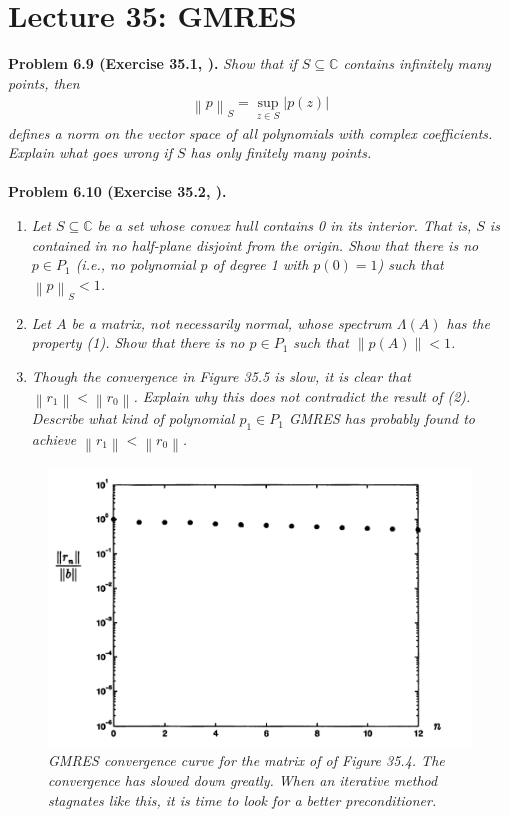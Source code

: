 \documentclass[a4paper,oneside]{book}
\numberwithin{equation}{chapter}
\begin{document}
\section{Lecture 35: GMRES}
\textbf{Problem 6.9 (Exercise 35.1, \cite{1}).} \textit{Show that if $S \subseteq \mathbb{C}$ contains infinitely many points, then}
\begin{align}
{\left\| p \right\|_S} = \mathop {\sup }\limits_{z \in S} \left| {p\left( z \right)} \right|
\end{align}
\textit{defines a norm on the vector space of all polynomials with complex coefficients. Explain what goes wrong if $S$ has only finitely many points.}\\
\\
\textbf{Problem 6.10 (Exercise 35.2, \cite{1}).} 
\begin{enumerate}
\item \textit{Let $S \subseteq \mathbb{C}$ be a set whose convex hull contains 0 in its interior. That is, $S$ is contained in no half-plane disjoint from the origin. Show that there is no $p\in P_1$ (i.e., no polynomial $p$ of degree 1 with $p\left(0\right)=1$) such that $\left\|p\right\| _S<1$.}
\item \textit{Let $A$ be a matrix, not necessarily normal, whose spectrum $\Lambda \left(A\right)$ has the property (1). Show that there is no $p\in P_1$ such that $\left\|p\left(A\right)\right\|<1$.}
\item \textit{Though the convergence in Figure 35.5 is slow, it is clear that $\left\| {{r_1}} \right\| < \left\| {{r_0}} \right\|$. Explain why this does not contradict the result of (2). Describe what kind of polynomial $p_1\in P_1$ GMRES has probably found to achieve $\left\| {{r_1}} \right\| < \left\| {{r_0}} \right\|$.}
\end{enumerate} 
\begin{figure}[H]
	\centering
	\includegraphics[scale=0.35]{10}
	\caption{\textit{GMRES convergence curve for the matrix of of Figure 35.4. The convergence has slowed down greatly. When an iterative method stagnates like this, it is time to look for a better preconditioner.}}
\end{figure}
\end{document}

